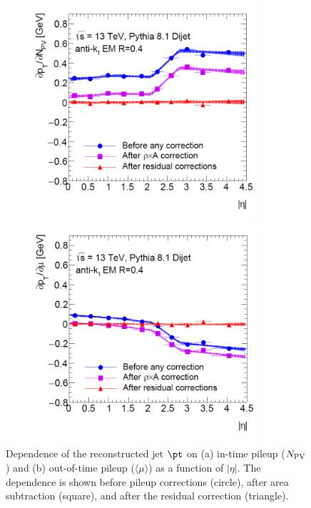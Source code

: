 \begin{figure}[t!]
\begin{subfigure}{0.5\textwidth}
  \centering
  \includegraphics[width=0.9\textwidth]{figures/Objects/Pileup_EM_NPVClosure.png}
  \caption{}
  \label{fig:obj:jet:npvdep}
\end{subfigure}
\begin{subfigure}{0.5\textwidth}
  \centering
  \includegraphics[width=0.9\textwidth]{figures/Objects/Pileup_EM_MuClosure.png}
  \caption{}
  \label{fig:obj:jet:mudep}
\end{subfigure}

\captionsetup{width=0.85\textwidth} \caption{\small Dependence of the reconstructed jet $\pt$ on (a) in-time pileup ($N_{\rm PV}$) and (b) out-of-time pileup ($\langle\mu\rangle$) as a function of $|\eta|$. The dependence is shown before pileup corrections (circle), after area subtraction (square), and after the residual correction (triangle).}
\label{fig:obj:jet:npvmudep}
\end{figure}

